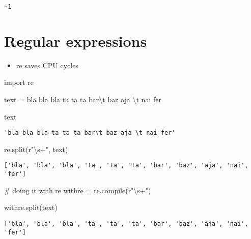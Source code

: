 \documentclass[
  letterpaper,
  DIV=11,
  numbers=noendperiod]{scrreprt}
\newenvironment{Shaded}{\begin{snugshade}}{\end{snugshade}}
\newcommand{\BuiltInTok}[1]{\textcolor[rgb]{0.00,0.23,0.31}{#1}}
\newcommand{\CharTok}[1]{\textcolor[rgb]{0.13,0.47,0.30}{#1}}
\newcommand{\CommentTok}[1]{\textcolor[rgb]{0.37,0.37,0.37}{#1}}
\newcommand{\ImportTok}[1]{\textcolor[rgb]{0.00,0.46,0.62}{#1}}
\newcommand{\NormalTok}[1]{\textcolor[rgb]{0.00,0.23,0.31}{#1}}
\newcommand{\OperatorTok}[1]{\textcolor[rgb]{0.37,0.37,0.37}{#1}}
\newcommand{\StringTok}[1]{\textcolor[rgb]{0.13,0.47,0.30}{#1}}
\newcommand{\VerbatimStringTok}[1]{\textcolor[rgb]{0.13,0.47,0.30}{#1}}
\providecommand{\tightlist}{%
  \setlength{\itemsep}{0pt}\setlength{\parskip}{0pt}}\usepackage{longtable,booktabs,array}
\begin{document}
\begin{verbatim}
-1
\end{verbatim}

\hypertarget{regular-expressions}{%
\section{Regular expressions}\label{regular-expressions}}

\begin{itemize}
\tightlist
\item
  re saves CPU cycles
\end{itemize}

\begin{Shaded}
\begin{Highlighting}[]
\ImportTok{import}\NormalTok{ re}

\NormalTok{text }\OperatorTok{=} \StringTok{\textquotesingle{}bla bla bla ta ta ta bar}\CharTok{\textbackslash{}t}\StringTok{ baz aja }\CharTok{\textbackslash{}t}\StringTok{ nai fer\textquotesingle{}}

\NormalTok{text}
\end{Highlighting}
\end{Shaded}

\begin{verbatim}
'bla bla bla ta ta ta bar\t baz aja \t nai fer'
\end{verbatim}

\begin{Shaded}
\begin{Highlighting}[]
\NormalTok{re.split(}\VerbatimStringTok{r"\textbackslash{}s+"}\NormalTok{, text)}
\end{Highlighting}
\end{Shaded}

\begin{verbatim}
['bla', 'bla', 'bla', 'ta', 'ta', 'ta', 'bar', 'baz', 'aja', 'nai', 'fer']
\end{verbatim}

\begin{Shaded}
\begin{Highlighting}[]
\CommentTok{\# doing it with re}
\NormalTok{withre }\OperatorTok{=}\NormalTok{ re.}\BuiltInTok{compile}\NormalTok{(}\VerbatimStringTok{r"\textbackslash{}s+"}\NormalTok{)}

\NormalTok{withre.split(text)}
\end{Highlighting}
\end{Shaded}

\begin{verbatim}
['bla', 'bla', 'bla', 'ta', 'ta', 'ta', 'bar', 'baz', 'aja', 'nai', 'fer']
\end{verbatim}
\end{document}
